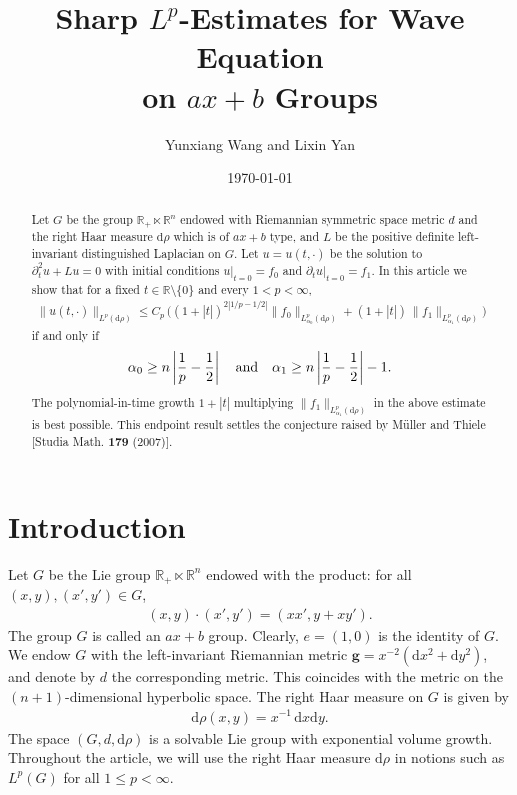 \documentclass[a4paper,12pt]{amsart}
\title[Sharp $L^p$-Estimates for Wave Equation on $ax+b$ Groups]{Sharp $L^p$-Estimates for Wave Equation\\
on $ax+b$ Groups}
\author[Y. Wang and L. Yan]{Yunxiang Wang and Lixin Yan}
\date{\today}
\numberwithin{equation}{section}
\theoremstyle{definition}
\theoremstyle{remark}
\numberwithin{theorem}{section}
\newcommand{\R}{\mathbb{R}}
\newcommand{\g}{\mathbf{g}}
\renewcommand{\d}{\mathrm{d}}
\begin{document}
\begin{abstract}
Let $G$ be the group $\mathbb{R}_+\ltimes \mathbb{R}^n$ endowed with Riemannian symmetric space metric $d$ and the right Haar measure $\mathrm{d} \rho$ which is of $ax+b$ type, and $L$ be the positive definite left-invariant distinguished Laplacian on $G$. Let $u=u(t,\cdot)$ be the solution to $\partial_t^2u+Lu=0$ with initial conditions $u|_{t=0}=f_0$ and $\partial_tu|_{t=0}=f_1$. In this article we show that for a fixed $t\in\mathbb{R}\setminus\{0\}$ and every $1<p<\infty$, 
\begin{align*}
\|u(t,\cdot)\|_{L^p(\mathrm{d}\rho)}\leq C_p\,\Big( (1+|t|)^{2|1/p-1/2|}\|f_0\|_{L^p_{\alpha_0}(\mathrm{d}\rho)}+(1+|t|)\,\|f_1\|_{L^p_{\alpha_1}(\mathrm{d}\rho)}\Big) 
\end{align*}
if and only if
\begin{align*}
\alpha_0\geq n\left|{1\over p}-{1\over2}\right| \quad \mbox{and}
\quad \alpha_1\geq n\left|{1\over p}-{1\over2}\right|-1.
\end{align*} 
The polynomial-in-time growth $1+|t|$ multiplying $\|f_1\|_{L^p_{\alpha_1}(\mathrm{d}\rho)}$ in the above estimate is best possible. 
This endpoint result settles the conjecture raised by M\"{u}ller and Thiele [Studia Math. \textbf{179} (2007)].





\end{abstract}

\maketitle




\section{Introduction}\label{sec1}
Let $ G$ be the Lie group $\R_+\ltimes \R^n$ endowed with the product: for all $(x,y), (x',y')\in G$,
\begin{align*}
(x,y)\cdot (x',y')=(xx',y+xy').
\end{align*}
The group $G$ is called an $ax+b$ group. Clearly, $e=(1, 0)$ is the identity of $G$. We endow $G$ with the left-invariant Riemannian metric $\g=x^{-2}(\d x^2 +\d y^2)$, and denote by $d$ the corresponding metric. This coincides with the metric on the $(n+1)$-dimensional hyperbolic space. The right Haar measure on $G$ is given by
\begin{align*}
\d \rho(x,y)=x^{-1}\,\d x\d y.
\end{align*}
The space $(G, d, \d \rho)$ is a solvable Lie group with exponential volume growth. Throughout the article, we will use the right Haar measure $\d \rho$ in notions such as $L^p(G)$ for all $1\leq p< \infty$.
\end{document}
